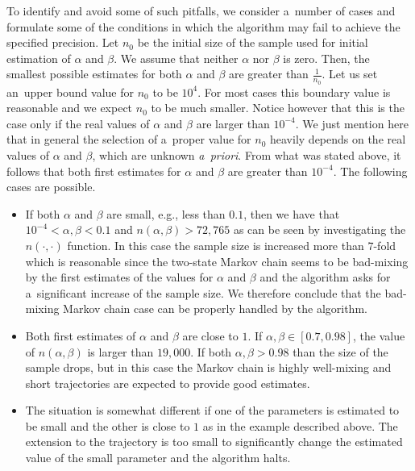 \documentclass[runningheads,a4paper]{llncs}
\begin{document}
To identify and avoid some of such pitfalls, we consider a~number of cases and formulate some
of the conditions in which the algorithm may fail to achieve the specified precision.
Let $n_0$ be the initial size of the sample used for initial estimation of $\alpha$ and $\beta$.
We assume that neither $\alpha$ nor $\beta$ is zero. Then, the smallest possible estimates for
both $\alpha$ and $\beta$ are greater than $\frac{1}{n_0} $. Let us set an~upper bound value for
$n_0$ to be $10^4$. For most cases this boundary value is reasonable and we expect $n_0$ to be
much smaller. Notice however that this is the case only if the real values of $\alpha$ and $\beta$
are larger than $10^{-4}$. We just mention here that in general the selection of a~proper value
for $n_0$ heavily depends on the real values of $\alpha$ and $\beta$, which are unknown
\emph{a~priori}. From what was stated above, it follows that both first estimates for $\alpha$ and
$\beta$ are greater than $10^{-4}$. The following cases are possible.
\begin{itemize}
  \item If both $\alpha$ and $\beta$ are small, e.g., less than $0.1$, then we have that
    $10^{-4}<\alpha,\beta<0.1$ and $n(\alpha,\beta) > 72,765$ as can be seen by investigating the
    $n(\cdot,\cdot)$ function. In this case the sample size is increased more than $7$-fold
    which is reasonable since the two-state Markov chain seems to be bad-mixing by the first
    estimates of the values for $\alpha$ and $\beta$ and the algorithm asks for a~significant
    increase of the sample size. We therefore conclude that the bad-mixing Markov chain case can
    be properly handled by the algorithm.

  \item Both first estimates of $\alpha$ and $\beta$ are close to $1$. If $\alpha,\beta \in
    [0.7,0.98]$, the value of $n(\alpha,\beta)$ is larger than $19,000$. If both $\alpha,\beta >
    0.98$ than the size of the sample drops, but in this case the Markov chain is highly
    well-mixing and short trajectories are expected to provide good estimates.

  \item The situation is somewhat different if one of the parameters is estimated to be small
    and the other is close to $1$ as in the example described above. The extension to the
    trajectory is too small to significantly change the estimated value of the small parameter
    and the algorithm halts.
\end{itemize}
\end{document}
